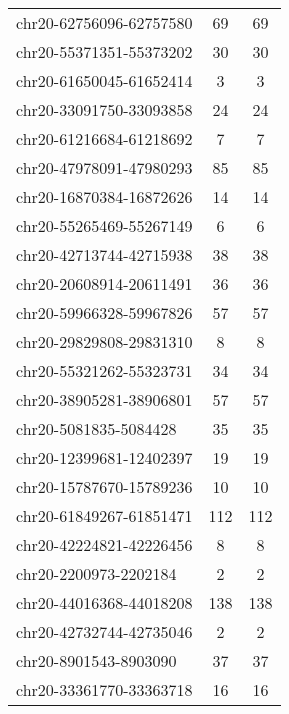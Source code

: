 \begin{longtable}{lSS}
	chr20-62756096-62757580 & 69   & 69                              \\
	chr20-55371351-55373202 & 30   & 30                              \\
	chr20-61650045-61652414 & 3    & 3                               \\
	chr20-33091750-33093858 & 24   & 24                              \\
	chr20-61216684-61218692 & 7    & 7                               \\
	chr20-47978091-47980293 & 85   & 85                              \\
	chr20-16870384-16872626 & 14   & 14                              \\
	chr20-55265469-55267149 & 6    & 6                               \\
	chr20-42713744-42715938 & 38   & 38                              \\
	chr20-20608914-20611491 & 36   & 36                              \\
	chr20-59966328-59967826 & 57   & 57                              \\
	chr20-29829808-29831310 & 8    & 8                               \\
	chr20-55321262-55323731 & 34   & 34                              \\
	chr20-38905281-38906801 & 57   & 57                              \\
	chr20-5081835-5084428   & 35   & 35                              \\
	chr20-12399681-12402397 & 19   & 19                              \\
	chr20-15787670-15789236 & 10   & 10                              \\
	chr20-61849267-61851471 & 112  & 112                             \\
	chr20-42224821-42226456 & 8    & 8                               \\
	chr20-2200973-2202184   & 2    & 2                               \\
	chr20-44016368-44018208 & 138  & 138                             \\
	chr20-42732744-42735046 & 2    & 2                               \\
	chr20-8901543-8903090   & 37   & 37                              \\
	chr20-33361770-33363718 & 16   & 16                              \\

\end{longtable}
